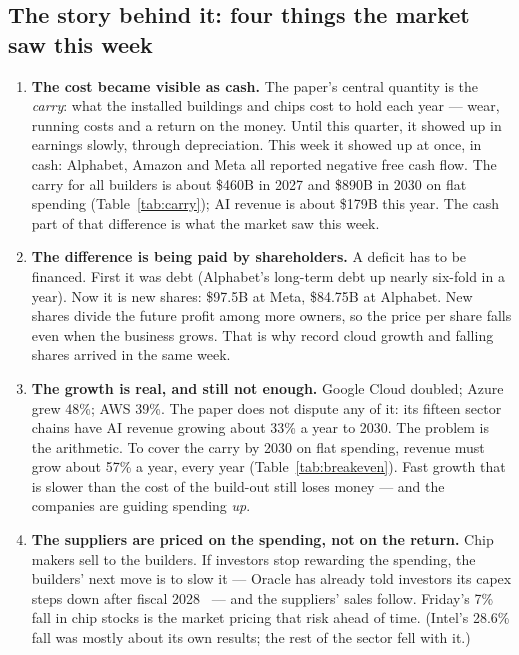 \documentclass[11pt,letterpaper]{article}
\begin{document}
\subsection*{The story behind it: four things the market saw this week}\label{news:why}
\begin{enumerate}
\item \textbf{The cost became visible as cash.} The paper's central quantity is the \emph{carry}: what the installed buildings and chips cost to hold each year --- wear, running costs and a return on the money. Until this quarter, it showed up in earnings slowly, through depreciation. This week it showed up at once, in cash: Alphabet, Amazon and Meta all reported negative free cash flow. The carry for all builders is about \$460B in 2027 and \$890B in 2030 on flat spending (Table~\ref{tab:carry}); AI revenue is about \$179B this year. The cash part of that difference is what the market saw this week.
\item \textbf{The difference is being paid by shareholders.} A deficit has to be financed. First it was debt (Alphabet's long-term debt up nearly six-fold in a year). Now it is new shares: \$97.5B at Meta, \$84.75B at Alphabet. New shares divide the future profit among more owners, so the price per share falls even when the business grows. That is why record cloud growth and falling shares arrived in the same week.
\item \textbf{The growth is real, and still not enough.} Google Cloud doubled; Azure grew 48\%; AWS 39\%. The paper does not dispute any of it: its fifteen sector chains have AI revenue growing about 33\% a year to 2030. The problem is the arithmetic. To cover the carry by 2030 on flat spending, revenue must grow about 57\% a year, every year (Table~\ref{tab:breakeven}). Fast growth that is slower than the cost of the build-out still loses money --- and the companies are guiding spending \emph{up}.
\item \textbf{The suppliers are priced on the spending, not on the return.} Chip makers sell to the builders. If investors stop rewarding the spending, the builders' next move is to slow it --- Oracle has already told investors its capex steps down after fiscal 2028~\cite{ref:orcl_investor_day} --- and the suppliers' sales follow. Friday's 7\% fall in chip stocks is the market pricing that risk ahead of time. (Intel's 28.6\% fall was mostly about its own results; the rest of the sector fell with it.)
\end{enumerate}
\end{document}
